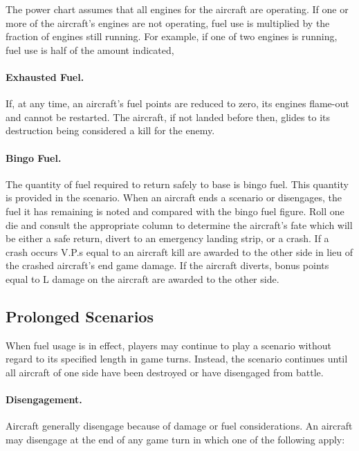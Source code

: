 The power chart assumes that all engines for the aircraft are operating. If one or more of the aircraft's engines are not operating, fuel use is multiplied by the fraction of engines still running. For example, if one of two engines is running, fuel use is half of the amount indicated,

\paragraph{Exhausted Fuel.} If, at any time, an aircraft's fuel points are reduced to zero, its engines flame-out and cannot be restarted. The aircraft, if not landed before then, glides to its destruction being considered a kill for the enemy.


\paragraph{Bingo Fuel.} The quantity of fuel required to return safely to base is bingo fuel. This quantity is provided in the scenario. When an aircraft ends a scenario or disengages, the fuel it has remaining is noted and compared with the bingo fuel figure. Roll one die and consult the appropriate column  to determine the aircraft's fate which will be either a safe return, divert to an emergency landing strip, or a crash. If a crash occurs V.P.s equal to an aircraft kill are awarded to the other side in lieu of the crashed aircraft's end game damage. If the aircraft diverts, bonus points equal to L damage on the aircraft are awarded to the other side.

\subsection{Prolonged Scenarios}

When fuel usage is in effect, players may continue to play a scenario without regard to its specified length in game turns. Instead, the scenario continues until all aircraft of one side have been destroyed or have disengaged from battle.

\paragraph{Disengagement.} Aircraft generally disengage because of damage or fuel considerations. An aircraft may disengage at the end of any game turn in which one of the following apply:

